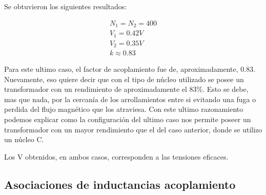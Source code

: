 \documentclass{article}
\begin{document}
Se obtuvieron los siguientes resultados:

\begin{align*}
N_{1} = N_{2} = 400 \\
V_{1} =  0.42 V \\ 
V_{2} =  0.35 V \\
k \approx  0.83
\end{align*}

Para este ultimo caso, el factor de acoplamiento fue de, aproximadamente, 0.83. Nuevamente, eso quiere decir que con el tipo de núcleo utilizado se posee un transformador con un rendimiento de aproximadamente el 83\%. Esto se debe, mas que nada, por la cercanía de los arrollamientos entre si evitando una fuga o perdida del flujo magnético que los atraviesa. Con este ultimo razonamiento podemos explicar como la configuración del ultimo caso nos permite poseer un transformador con un mayor rendimiento que el del caso anterior, donde se utilizo un núcleo C.

Los V obtenidos, en ambos casos, corresponden a las tensiones eficaces.

\subsection{Asociaciones de inductancias acoplamiento}
\end{document}
